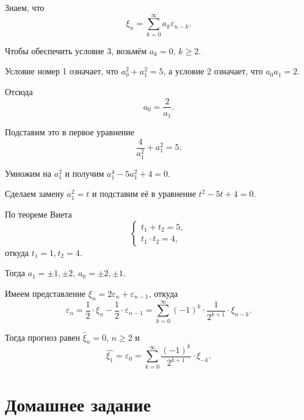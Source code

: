 Знаем, что
\begin{equation*}
  \xi_n =
  \sum \limits_{k = 0}^{ \infty } a_k \varepsilon_{n - k}.
\end{equation*}

Чтобы обеспечить условие 3, возьмём $a_k = 0, \, k \geq 2$.

Условие номер 1 означает, что $a_0^2 + a_1^2 = 5$, а условие 2 означает, что $a_0 a_1 = 2$.

Отсюда
\begin{equation*}
  a_0 =
  \frac{2}{a_1}.
\end{equation*}

Подставим это в первое уравнение
\begin{equation*}
  \frac{4}{a_1^2} + a_1^2 = 5.
\end{equation*}

Умножим на $a_1^2$ и получим $a_1^4 - 5a_1^2 + 4 = 0$.

Сделаем замену $a_1^2 = t$ и подставим её в уравнение $t^2 - 5t + 4 = 0$.

По теореме Виета
\begin{equation*}
  \begin{cases}
    t_1 + t_2 = 5, \\
    t_1 \cdot t_2 = 4,
  \end{cases}
\end{equation*}
откуда $t_1 = 1, t_2 = 4$.

Тогда $a_1 = \pm 1, \pm 2, \, a_0 = \pm 2, \pm 1$.

Имеем представление $ \xi_n = 2 \varepsilon_n + \varepsilon_{n - 1}$, откуда
\begin{equation*}
  \varepsilon_n =
  \frac{1}{2} \cdot \xi_n - \frac{1}{2} \cdot \varepsilon_{n - 1} =
  \sum \limits_{k = 0}^{ \infty } \left( -1 \right)^k \cdot \frac{1}{2^{k + 1}} \cdot \xi_{n - k}.
\end{equation*}

Тогда прогноз равен $ \hat{ \xi }_n = 0, \, n \geq 2$ и
\begin{equation*}
  \hat{ \xi_1} =
  \varepsilon_0 =
  \sum \limits_{k = 0}^{ \infty } \frac{ \left( -1 \right)^k}{2^{k + 1}} \cdot \xi_{-k}.
\end{equation*}

\section*{Домашнее задание}

